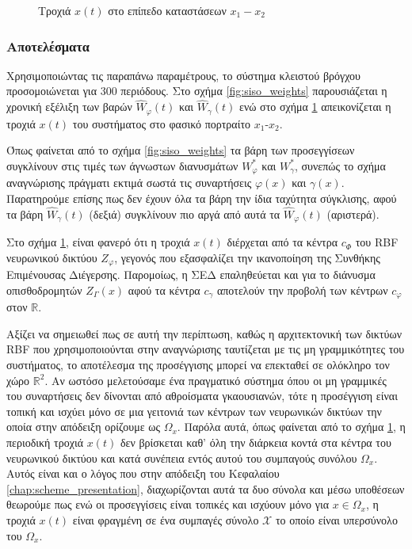 {
\begin{figure}
	
	\captionsetup{format=plain}
	\caption{Τροχιά $x(t)$ στο επίπεδο καταστάσεων $x_1 - x_2$}
	\label{fig:phase_plain}	
\end{figure}

\subsubsection{Αποτελέσματα}
Χρησιμοποιώντας τις παραπάνω παραμέτρους, το σύστημα κλειστού βρόγχου προσομοιώνεται για 300 περιόδους. Στο σχήμα \ref{fig:siso_weights} παρουσιάζεται η χρονική εξέλιξη των βαρών $\hat{W}_{\varphi}(t)$ και $\hat{W}_{\gamma}(t)$ ενώ στο σχήμα \ref{fig:phase_plain} απεικονίζεται η τροχιά $x(t)$ του συστήματος στο φασικό πορτραίτο $x_1$-$x_2$.

Όπως φαίνεται από το σχήμα \ref{fig:siso_weights} τα βάρη των προσεγγίσεων συγκλίνουν στις τιμές των άγνωστων διανυσμάτων $W_\varphi^*$ και $W_\gamma^*$, συνεπώς το σχήμα αναγνώρισης πράγματι εκτιμά σωστά τις συναρτήσεις $\varphi(x)$ και $\gamma(x)$. Παρατηρούμε επίσης πως δεν έχουν όλα τα βάρη την ίδια ταχύτητα σύγκλισης, αφού τα βάρη $\hat{W}_{\gamma}(t)$ (δεξιά) συγκλίνουν πιο αργά από αυτά τα $\hat{W}_{\varphi}(t)$ (αριστερά).

}

Στο σχήμα \ref{fig:phase_plain}, είναι φανερό ότι η τροχιά $x(t)$ διέρχεται από τα κέντρα $c_\Phi$ του RBF νευρωνικού δικτύου $Z_\varphi$, γεγονός που εξασφαλίζει την ικανοποίηση της Συνθήκης Επιμένουσας Διέγερσης. Παρομοίως, η ΣΕΔ επαληθεύεται και για το διάνυσμα οπισθοδρομητών $Z_\Gamma(x)$ αφού τα κέντρα $c_\gamma$ αποτελούν την προβολή των κέντρων $c_\varphi$ στον $\mathbb{R}$.

Αξίζει να σημειωθεί πως σε αυτή την περίπτωση, καθώς η αρχιτεκτονική των δικτύων RBF που χρησιμοποιούνται στην αναγνώρισης ταυτίζεται με τις μη γραμμικότητες του συστήματος, το αποτέλεσμα της προσέγγισης μπορεί να επεκταθεί σε ολόκληρο τον χώρο $\mathbb{R}^2$. Αν ωστόσο μελετούσαμε ένα πραγματικό σύστημα όπου οι μη γραμμικές του συναρτήσεις δεν δίνονται από αθροίσματα γκαουσιανών, τότε η προσέγγιση είναι τοπική και ισχύει μόνο σε μια γειτονιά των κέντρων των νευρωνικών δικτύων την οποία στην απόδειξη ορίζουμε ως $\Omega_x$. Παρόλα αυτά, όπως φαίνεται από το σχήμα \ref{fig:phase_plain}, η περιοδική τροχιά $x(t)$ δεν βρίσκεται καθ' όλη την διάρκεια κοντά στα κέντρα του νευρωνικού δικτύου και κατά συνέπεια εντός αυτού του συμπαγούς συνόλου $\Omega_x$. Αυτός είναι και ο λόγος που στην απόδειξη του Κεφαλαίου \ref{chap:scheme_presentation}, διαχωρίζονται αυτά τα δυο σύνολα και μέσω υποθέσεων θεωρούμε πως ενώ οι προσεγγίσεις είναι τοπικές και ισχύουν μόνο για $x \in \Omega_x$, η τροχιά $x(t)$ είναι φραγμένη σε ένα συμπαγές σύνολο $\mathcal{X}$ το οποίο είναι υπερσύνολο του $\Omega_x$.

